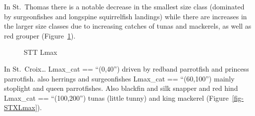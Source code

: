 \documentclass[
  letterpaper,
  oneside,
  open=any]{scrbook}
\begin{document}
In St.~Thomas there is a notable decrease in the smallest size class
(dominated by surgeonfishes and longspine squirrelfish landings) while
there are increases in the larger size classes due to increasing catches
of tunas and mackerels, as well as red grouper
(Figure~\ref{fig-STTLmax}).

\begin{figure}


\caption{\label{fig-STTLmax}STT Lmax}

\end{figure}%

In St.~Croix\ldots{} Lmax\_cat == ``(0,40'') driven by redband
parrotfish and princess parrotfish. also herrings and surgeonfishes
Lmax\_cat == ``(60,100'') mainly stoplight and queen parrotfishes. Also
blackfin and silk snapper and red hind Lmax\_cat == ``(100,200'') tunas
(little tunny) and king mackerel (Figure~\ref{fig-STXLmax}).
\end{document}
